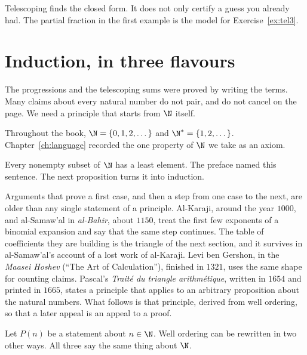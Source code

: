 Telescoping finds the closed form. It does not only certify a guess you already had. The partial fraction in the first example is the model for Exercise~\ref{ex:tel3}.

\section{Induction, in three flavours}\label{sec:induction}

The progressions and the telescoping sums were proved by writing the terms. Many claims about every natural number do not pair, and do not cancel on the page. We need a principle that starts from $\N$ itself.

Throughout the book, $\N=\{0,1,2,\dots\}$ and $\N^*=\{1,2,\dots\}$. Chapter~\ref{ch:language} recorded the one property of $\N$ we take as an axiom.

\begin{definitionx}
Every nonempty subset of $\N$ has a least element. The preface named this sentence. The next proposition turns it into induction.
\end{definitionx}

Arguments that prove a first case, and then a step from one case to the next, are older than any single statement of a principle. Al-Karaji, around the year $1000$, and al-Samaw'al in \emph{al-Bahir}, about $1150$, treat the first few exponents of a binomial expansion and say that the same step continues. The table of coefficients they are building is the triangle of the next section, and it survives in al-Samaw'al's account of a lost work of al-Karaji. Levi ben Gershon, in the \emph{Maasei Hoshev} (``The Art of Calculation''), finished in $1321$, uses the same shape for counting claims. Pascal's \emph{Trait\'e du triangle arithm\'etique}, written in $1654$ and printed in $1665$, states a principle that applies to an arbitrary proposition about the natural numbers. What follows is that principle, derived from well ordering, so that a later appeal is an appeal to a proof.

Let $P(n)$ be a statement about $n\in\N$. Well ordering can be rewritten in two other ways. All three say the same thing about $\N$.

